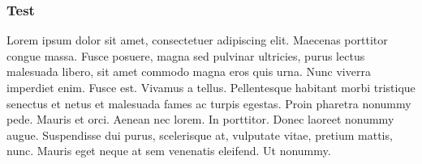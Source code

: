 \begin{frame}
	\frametitle{Test}
	Lorem ipsum dolor sit amet, consectetuer adipiscing elit. Maecenas porttitor congue massa. Fusce posuere, magna sed pulvinar ultricies, purus lectus malesuada libero, sit amet commodo magna eros quis urna.
	Nunc viverra imperdiet enim. Fusce est. Vivamus a tellus.
	Pellentesque habitant morbi tristique senectus et netus et malesuada fames ac turpis egestas. Proin pharetra nonummy pede. Mauris et orci.
	Aenean nec lorem. In porttitor. Donec laoreet nonummy augue.
	Suspendisse dui purus, scelerisque at, vulputate vitae, pretium mattis, nunc. Mauris eget neque at sem venenatis eleifend. Ut nonummy.      
\end{frame}